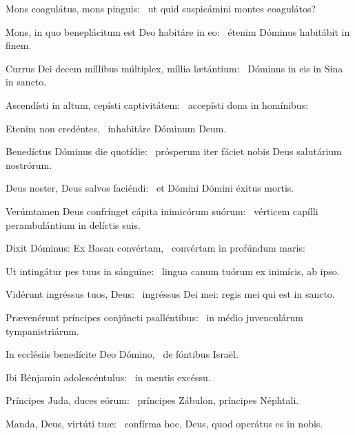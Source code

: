 \item Mons coagulátus, mons pinguis:~\psstar{} ut quid suspicámini montes coagulátos?

\item Mons, in quo beneplácitum est Deo habitáre in eo:~\psstar{} étenim Dóminus habitábit in finem.

\item Currus Dei decem míllibus múltiplex, míllia lætántium:~\psstar{} Dóminus in eis in Sina in sancto.

\item Ascendísti in altum, cepísti captivitátem:~\psstar{} accepísti dona in homínibus:

\item Etenim non credéntes,~\psstar{} inhabitáre Dóminum Deum.

\item Benedíctus Dóminus die quotídie:~\psstar{} prósperum iter fáciet nobis Deus salutárium nostrórum.

\item Deus noster, Deus salvos faciéndi:~\psstar{} et Dómini Dómini éxitus mortis.

\item Verúmtamen Deus confrínget cápita inimicórum suórum:~\psstar{} vérticem capílli perambulántium in delíctis suis.

\item Dixit Dóminus: Ex Basan convértam,~\psstar{} convértam in profúndum maris:

\item Ut intingátur pes tuus in sánguine:~\psstar{} lingua canum tuórum ex inimícis, ab ipso.

\item Vidérunt ingréssus tuos, Deus:~\psstar{} ingréssus Dei mei: regis mei qui est in sancto.

\item Prævenérunt príncipes conjúncti psalléntibus:~\psstar{} in médio juvenculárum tympanistriárum.

\item In ecclésiis benedícite Deo Dómino,~\psstar{} de fóntibus Israël.

\item Ibi Bénjamin adolescéntu\-lus:~\psstar{} in mentis excéssu.

\item Príncipes Juda, duces eórum:~\psstar{} príncipes Zábulon, príncipes Néphtali.

\item Manda, Deus, virtúti tuæ:~\psstar{} confírma hoc, Deus, quod operátus es in nobis.

